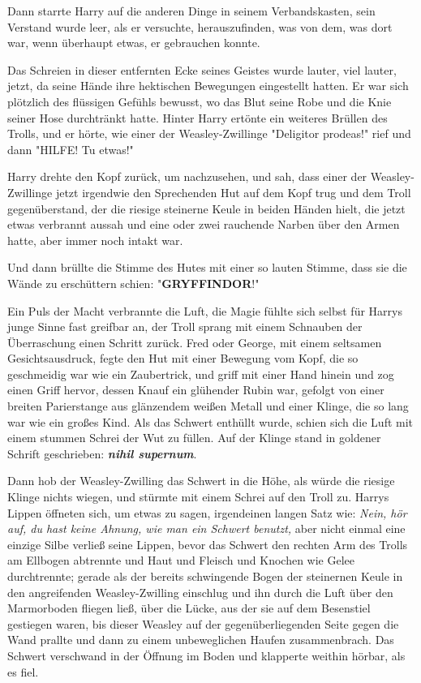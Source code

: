 {Dann starrte Harry auf die anderen Dinge in seinem Verbandskasten, sein Verstand wurde leer, als er versuchte, herauszufinden, was von dem, was dort war, wenn überhaupt etwas, er gebrauchen konnte.

Das Schreien in dieser entfernten Ecke seines Geistes wurde lauter, viel lauter, jetzt, da seine Hände ihre hektischen Bewegungen eingestellt hatten. Er war sich plötzlich des flüssigen Gefühls bewusst, wo das Blut seine Robe und die Knie seiner Hose durchtränkt hatte. Hinter Harry ertönte ein weiteres Brüllen des Trolls, und er hörte, wie einer der Weasley-Zwillinge "Deligitor prodeas!" rief und dann "HILFE! Tu etwas!"

Harry drehte den Kopf zurück, um nachzusehen, und sah, dass einer der Weasley-Zwillinge jetzt irgendwie den Sprechenden Hut auf dem Kopf trug und dem Troll gegenüberstand, der die riesige steinerne Keule in beiden Händen hielt, die jetzt etwas verbrannt aussah und eine oder zwei rauchende Narben über den Armen hatte, aber immer noch intakt war.

Und dann brüllte die Stimme des Hutes mit einer so lauten Stimme, dass sie die Wände zu erschüttern schien: "\textbf{GRYFFINDOR}!"

Ein Puls der Macht verbrannte die Luft, die Magie fühlte sich selbst für Harrys junge Sinne fast greifbar an, der Troll sprang mit einem Schnauben der Überraschung einen Schritt zurück. Fred oder George, mit einem seltsamen Gesichtsausdruck, fegte den Hut mit einer Bewegung vom Kopf, die so geschmeidig war wie ein Zaubertrick, und griff mit einer Hand hinein und zog einen Griff hervor, dessen Knauf ein glühender Rubin war, gefolgt von einer breiten Parierstange aus glänzendem weißen Metall und einer Klinge, die so lang war wie ein großes Kind. Als das Schwert enthüllt wurde, schien sich die Luft mit einem stummen Schrei der Wut zu füllen. Auf der Klinge stand in goldener Schrift geschrieben: \textbf{\emph{nihil supernum}}.

Dann hob der Weasley-Zwilling das Schwert in die Höhe, als würde die riesige Klinge nichts wiegen, und stürmte mit einem Schrei auf den Troll zu. Harrys Lippen öffneten sich, um etwas zu sagen, irgendeinen langen Satz wie: \emph{Nein, hör auf, du hast keine Ahnung, wie man ein Schwert benutzt,} aber nicht einmal eine einzige Silbe verließ seine Lippen, bevor das Schwert den rechten Arm des Trolls am Ellbogen abtrennte und Haut und Fleisch und Knochen wie Gelee durchtrennte; gerade als der bereits schwingende Bogen der steinernen Keule in den angreifenden Weasley-Zwilling einschlug und ihn durch die Luft über den Marmorboden fliegen ließ, über die Lücke, aus der sie auf dem Besenstiel gestiegen waren, bis dieser Weasley auf der gegenüberliegenden Seite gegen die Wand prallte und dann zu einem unbeweglichen Haufen zusammenbrach. Das Schwert verschwand in der Öffnung im Boden und klapperte weithin hörbar, als es fiel.

}
